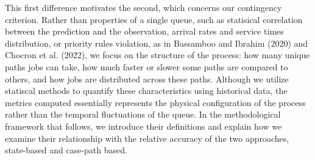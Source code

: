 \documentclass[
]{ceurart}
\begin{document}
This first difference motivates the second, which concerns our contingency criterion. Rather than properties of a single queue, such as statisical correlation between the prediction and the observation, arrival rates and 
service times distribution, or priority rules violation, as in Bassamboo and Ibrahim (2020) and Chocron et al. (2022), we focus on the structure of the process: how many unique paths jobs can take, how much faster or slower some paths are compared to others,
and how jobs are distributed across these paths. Although we utilize statiscal methods to quantify these characteristics using historical data, 
the metrics computed essentially represents the physical configuration of the process rather than the temporal fluctuations of the queue. In the methodological framework that follows,
we introduce their definitions and explain how we examine their relationship with the relative accuracy of the two approaches, state-based and case-path based.




\end{document}
